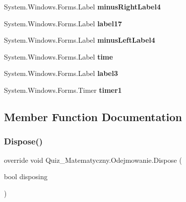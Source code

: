 \begin{DoxyCompactItemize}
System.\+Windows.\+Forms.\+Label {\bfseries minus\+Right\+Label4}
\item 
\mbox{\label{class_quiz___matematyczny_1_1_odejmowanie_a9abe9bc0ac1695dc5bd0f25f999daf8c}} 
System.\+Windows.\+Forms.\+Label {\bfseries label17}
\item 
\mbox{\label{class_quiz___matematyczny_1_1_odejmowanie_ae92f9e7612d4b9fd14bd5e005e920d98}} 
System.\+Windows.\+Forms.\+Label {\bfseries minus\+Left\+Label4}
\item 
\mbox{\label{class_quiz___matematyczny_1_1_odejmowanie_a6da3ca39bcfd01e2112ef22e86e5f380}} 
System.\+Windows.\+Forms.\+Label {\bfseries time}
\item 
\mbox{\label{class_quiz___matematyczny_1_1_odejmowanie_a63b93dbac0321f7185f8c00521fa4af1}} 
System.\+Windows.\+Forms.\+Label {\bfseries label3}
\item 
\mbox{\label{class_quiz___matematyczny_1_1_odejmowanie_a8357075ef3df269d2c7747ff969c8fd6}} 
System.\+Windows.\+Forms.\+Timer {\bfseries timer1}
\end{DoxyCompactItemize}


\subsection{Member Function Documentation}
\mbox{\label{class_quiz___matematyczny_1_1_odejmowanie_ab5092b577eee3d3e254b0910cd1ab9fa}} 
\subsubsection{\texorpdfstring{Dispose()}{Dispose()}}
{\footnotesize\ttfamily override void Quiz\+\_\+\+Matematyczny.\+Odejmowanie.\+Dispose (\begin{DoxyParamCaption}\item[{bool}]{disposing }\end{DoxyParamCaption})\hspace{0.3cm}{\ttfamily [protected]}}



